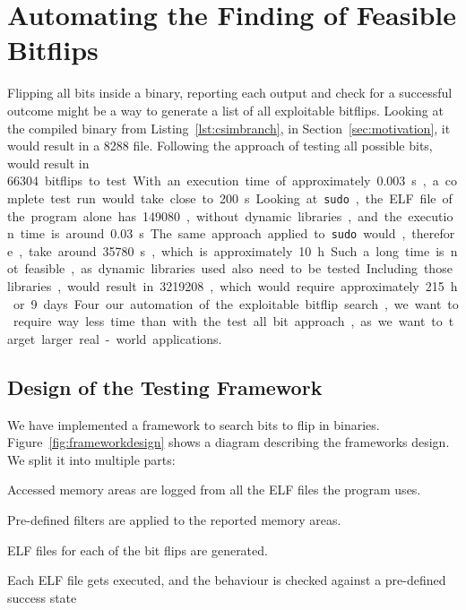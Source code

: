 \section{Automating the Finding of Feasible Bitflips}

Flipping all bits inside a binary, reporting each output and check for a
successful outcome might be a way to generate a list of all exploitable
bitflips. Looking at the compiled binary from Listing~\ref{lst:csimbranch}, in
Section~\ref{sec:motivation}, it would result in a \SI{8288}{\byte} file.
Following the approach of testing all possible bits, would result in \SI{66304}
bitflips to test. With an execution time of approximately \SI{0.003}{\second}, a
complete test run would take close to \SI{200}{\second}.

Looking at \texttt{sudo}, the ELF file of the program alone has
\SI{149080}{\byte}, without dynamic libraries, and the execution time is around
\SI{0.03}{\second}. The same approach applied to \texttt{sudo} would, therefore,
take around \SI{35780}{\second}, which is approximately \SI{10}{\hour}. Such a
long time is not feasible, as dynamic libraries used also need to be tested.
Including those libraries, would result in \SI{3219208}{\byte}, which would
require approximately \SI{215}{\hour} or \SI{9} days.

Four our automation of the exploitable bitflip search, we want to require way
less time than with the test all bit approach, as we want to target larger
real-world applications.

\subsection{Design of the Testing Framework}

We have implemented a framework to search bits to flip in binaries.
Figure~\ref{fig:frameworkdesign} shows a diagram describing the
framework\textquotesingle s design. We split it into multiple parts:

\begin{enumerate}
\begin{samepage}
  \item Accessed memory areas are logged from all the ELF files the program
uses.
  \item Pre-defined filters are applied to the reported memory areas.
  \item ELF files for each of the bit flips are generated.
  \item Each ELF file gets executed, and the behaviour is checked against a
pre-defined success state
\end{samepage}
\end{enumerate}

